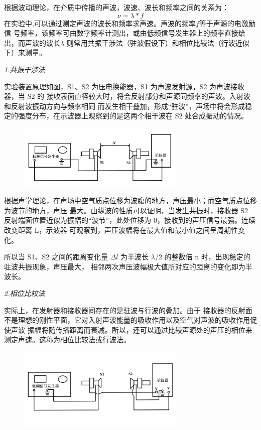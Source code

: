 \documentclass[UTF8]{ctexart}
\begin{document}
    根据波动理论，在介质中传播的声波，波速、波长和频率之间的关系为：
    \begin{equation}
        \nu =\lambda *f
    \end{equation}
    在实验中,可以通过测定声波的波长和频率求声速。声波的频率$f$等于声源的电激励信
    号频率，该频率可由数字频率计测出，或由低频信号发生器上的频率直接给出，而声波的波长$\lambda $
    则常用共振干涉法（驻波假设下）和相位比较法（行波近似下）来测量。

    \emph{1.共振干涉法}

    

    实验装置原理如图，S1、S2 为压电换能器，S1 为声波发射源，S2 为声波接收器，当 S2 的
    接收表面直径较大时，将会反射部分和声源同频率的声波。入射波和反射波振动方向与频率相同
    而发生相干叠加，形成“驻波”，声场中将会形成稳定的强度分布，在示波器上观察到的是这两个相干波在 S2 处合成振动的情况。

    \begin{figure}[ht]
        \centering 
        \includegraphics[width=8cm]{驻波法.png}
    \end{figure}

    根据声学理论，在声场中空气质点位移为波腹的地方，声压最小；而空气质点位移为波节的地方，声压
   最大。由纵波的性质可以证明，当发生共振时，接收器 S2 反射端面位置近似为振幅的“波节”，此处位移为 0，接收到的声压信号最强。连续改变距离 L，示波器
   可观察到，声压波幅将在最大值和最小值之间呈周期性变化。
   
   所以当 S1、S2 之间的距离变化量 $\varDelta l$ 为半波长 $\lambda /2$ 的整数倍 n 时，出现稳定的驻波共振现象，声压最大，
   相邻两次声压波幅极大值所对应的距离的变化即为半波长。


    \emph{2.相位比较法}

    实际上，在发射器和接收器间存在的是驻波与行波的叠加。由于
    接收器的反射面不是理想的刚性平面，它对入射声波能量的吸收作用以及空气对声波的吸收作用促使声波
    振幅将随传播距离而衰减。所以，还可以通过比较声源处的声压的相位来测定声速。这称为相位比较法或行波法。

    \begin{figure}[ht]
        \centering 
        \includegraphics[width=8cm]{相位法.png}
    \end{figure}
\end{document}
